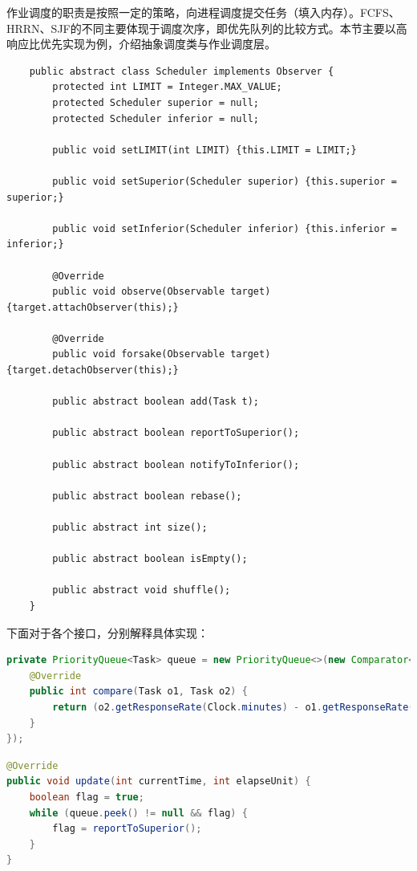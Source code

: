 \documentclass[UTF8]{ctexart}
\begin{document}
作业调度的职责是按照一定的策略，向进程调度提交任务（填入内存）。FCFS、HRRN、SJF的不同主要体现于调度次序，即优先队列的比较方式。本节主要以高响应比优先实现为例，介绍抽象调度类与作业调度层。

\begin{verbatim}
    public abstract class Scheduler implements Observer {
        protected int LIMIT = Integer.MAX_VALUE;
        protected Scheduler superior = null;
        protected Scheduler inferior = null;
    
        public void setLIMIT(int LIMIT) {this.LIMIT = LIMIT;}
    
        public void setSuperior(Scheduler superior) {this.superior = superior;}
    
        public void setInferior(Scheduler inferior) {this.inferior = inferior;}
    
        @Override
        public void observe(Observable target) {target.attachObserver(this);}
    
        @Override
        public void forsake(Observable target) {target.detachObserver(this);}
    
        public abstract boolean add(Task t);
    
        public abstract boolean reportToSuperior();
    
        public abstract boolean notifyToInferior();
    
        public abstract boolean rebase();
    
        public abstract int size();
    
        public abstract boolean isEmpty();
    
        public abstract void shuffle();
    }
\end{verbatim}

下面对于各个接口，分别解释具体实现：

\begin{lstlisting}[language={java},caption={收容队列（基于响应比的优先队列）}]
private PriorityQueue<Task> queue = new PriorityQueue<>(new Comparator<Task>() {
    @Override
    public int compare(Task o1, Task o2) {
        return (o2.getResponseRate(Clock.minutes) - o1.getResponseRate(Clock.minutes) > 0) ? (1) : (-1);
    }
});
\end{lstlisting}

\begin{lstlisting}[language={java},caption={调度方式（向上提交），调度时机（时间流逝）}]
@Override
public void update(int currentTime, int elapseUnit) {
    boolean flag = true;
    while (queue.peek() != null && flag) {
        flag = reportToSuperior();
    }
}
\end{lstlisting}
\end{document}

